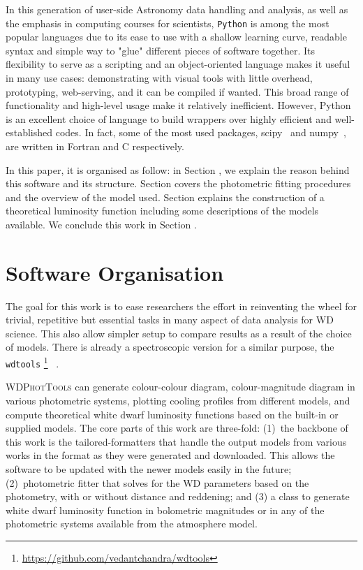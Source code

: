 \documentclass[fleqn,usenatbib]{rasti}
\begin{document}
In this generation of user-side Astronomy data handling and analysis, as well
as the emphasis in computing courses for scientists, \texttt{Python} is among
the most popular languages due to its ease to use with a shallow learning
curve, readable syntax and simple way to "glue" different pieces of software
together. Its flexibility to serve as a scripting and an object-oriented
language makes it useful in many use cases: demonstrating with visual tools
with little overhead, prototyping, web-serving, and it can be compiled if
wanted. This broad range of functionality and high-level usage make it
relatively inefficient. However, Python is an excellent choice of language to
build wrappers over highly efficient and well-established codes. In fact,
some of the most used packages, scipy~\citep{2020NatMe..17..261V} and
numpy~\citep{2020Natur.585..357H}, are written in Fortran and C respectively.

In this paper, it is organised as follow: in Section , we explain
the reason behind this software and its structure. Section  covers
the photometric fitting procedures and the overview of the model used. Section
 explains the construction of a theoretical luminosity function
including some descriptions of the models available. We conclude this
work in Section .

\section{Software Organisation}
The goal for this work is to ease researchers the effort in reinventing the
wheel for trivial, repetitive but essential tasks in many aspect of data
analysis for WD science. This also allow simpler setup to compare results as a
result of the choice of models. There is already a spectroscopic version
for a similar purpose, the \texttt{wdtools}
\footnote{\url{https://github.com/vedantchandra/wdtools}}~
\citep{2020MNRAS.497.2688C}.

\textsc{WDPhotTools} can generate colour-colour diagram, colour-magnitude
diagram in various photometric systems, plotting cooling profiles from
different models, and compute theoretical white dwarf luminosity functions
based on the built-in or supplied models. The core parts of this work are
three-fold: (1)~the backbone of this work is the tailored-formatters that
handle the output models from various works in the format as they were
generated and downloaded. This allows the software to be updated with the
newer models easily in the future; (2)~photometric fitter that solves for
the WD parameters based on the photometry, with or without distance and
reddening; and (3) a class to generate white dwarf luminosity function in
bolometric magnitudes or in any of the photometric systems available from the
atmosphere model.
\end{document}
